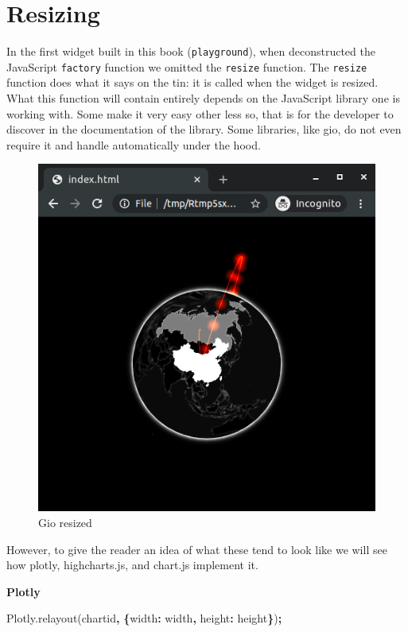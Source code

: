 \documentclass[
]{krantz}
\makeatletter
\newenvironment{Shaded}{\begin{snugshade}}{\end{snugshade}}
\newcommand{\AttributeTok}[1]{\textcolor[rgb]{0.61,0.61,0.61}{#1}}
\newcommand{\DataTypeTok}[1]{\textcolor[rgb]{0.27,0.27,0.27}{#1}}
\newcommand{\NormalTok}[1]{#1}
\newcommand{\OperatorTok}[1]{\textcolor[rgb]{0.43,0.43,0.43}{\textbf{#1}}}
\newcommand{\StringTok}[1]{\textcolor[rgb]{0.5,0.5,0.5}{#1}}
\newcommand{\VariableTok}[1]{\textcolor[rgb]{0,0,0}{#1}}
\newenvironment{kframe}{%
\medskip{}
\setlength{\fboxsep}{.8em}
 \def\at@end@of@kframe{}%
 \ifinner\ifhmode%
  \def\at@end@of@kframe{\end{minipage}}%
  \begin{minipage}{\columnwidth}%
 \fi\fi%
 \def\FrameCommand##1{\hskip\@totalleftmargin \hskip-\fboxsep
 \colorbox{shadecolor}{##1}\hskip-\fboxsep
     \hskip-\linewidth \hskip-\@totalleftmargin \hskip\columnwidth}%
 \MakeFramed {\advance\hsize-\width
   \@totalleftmargin\z@ \linewidth\hsize
   \@setminipage}}%
 {\par\unskip\endMakeFramed%
 \at@end@of@kframe}
\renewenvironment{Shaded}{\begin{kframe}}{\end{kframe}}
\makeatother
\begin{document}
\hypertarget{resizing}{%
\section{Resizing}\label{resizing}}

In the first widget built in this book (\texttt{playground}), when deconstructed the JavaScript \texttt{factory} function we omitted the \texttt{resize} function. The \texttt{resize} function does what it says on the tin: it is called when the widget is resized. What this function will contain entirely depends on the JavaScript library one is working with. Some make it very easy other less so, that is for the developer to discover in the documentation of the library. Some libraries, like gio, do not even require it and handle automatically under the hood.

\begin{figure}
\centering
\includegraphics{images/gio-small.png}
\caption{Gio resized}
\end{figure}

However, to give the reader an idea of what these tend to look like we will see how plotly, highcharts.js, and chart.js implement it.

\textbf{Plotly}

\begin{Shaded}
\begin{Highlighting}[]
\VariableTok{Plotly}\NormalTok{.}\AttributeTok{relayout}\NormalTok{(}\StringTok{\textquotesingle{}chartid\textquotesingle{}}\OperatorTok{,} \OperatorTok{\{}\DataTypeTok{width}\OperatorTok{:}\NormalTok{ width}\OperatorTok{,} \DataTypeTok{height}\OperatorTok{:}\NormalTok{ height}\OperatorTok{\}}\NormalTok{)}\OperatorTok{;}
\end{Highlighting}
\end{Shaded}
\end{document}
